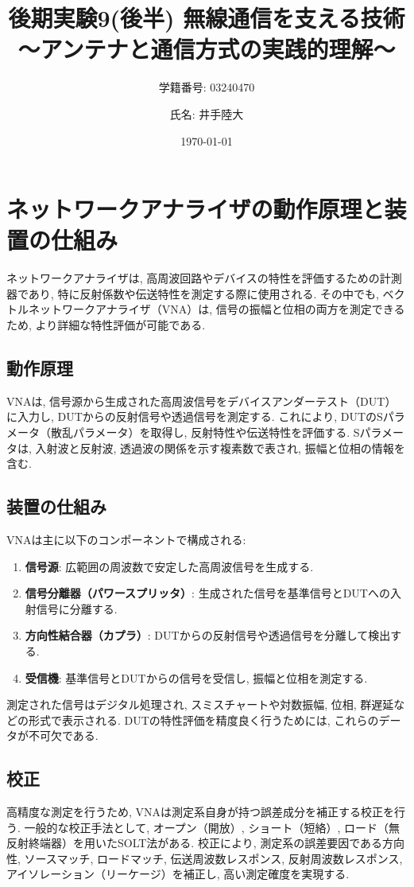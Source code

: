 \documentclass[a4paper, twocolumn]{article} %
\title{後期実験9(後半) 無線通信を支える技術
～アンテナと通信方式の実践的理解～}
\author{学籍番号: 03240470 \and 氏名: 井手陸大}
\date{\today}
\begin{document}
\maketitle

\section{ネットワークアナライザの動作原理と装置の仕組み}
ネットワークアナライザは, 高周波回路やデバイスの特性を評価するための計測器であり, 特に反射係数や伝送特性を測定する際に使用される. その中でも, ベクトルネットワークアナライザ（VNA）は, 信号の振幅と位相の両方を測定できるため, より詳細な特性評価が可能である.

\subsection{動作原理}
VNAは, 信号源から生成された高周波信号をデバイスアンダーテスト（DUT）に入力し, DUTからの反射信号や透過信号を測定する. これにより, DUTのSパラメータ（散乱パラメータ）を取得し, 反射特性や伝送特性を評価する. Sパラメータは, 入射波と反射波, 透過波の関係を示す複素数で表され, 振幅と位相の情報を含む.

\subsection{装置の仕組み}
VNAは主に以下のコンポーネントで構成される:
\begin{enumerate}
    \item \textbf{信号源}: 広範囲の周波数で安定した高周波信号を生成する.
    \item \textbf{信号分離器（パワースプリッタ）}: 生成された信号を基準信号とDUTへの入射信号に分離する.
    \item \textbf{方向性結合器（カプラ）}: DUTからの反射信号や透過信号を分離して検出する.
    \item \textbf{受信機}: 基準信号とDUTからの信号を受信し, 振幅と位相を測定する.
\end{enumerate}

測定された信号はデジタル処理され, スミスチャートや対数振幅, 位相, 群遅延などの形式で表示される. DUTの特性評価を精度良く行うためには, これらのデータが不可欠である.

\subsection{校正}
高精度な測定を行うため, VNAは測定系自身が持つ誤差成分を補正する校正を行う. 一般的な校正手法として, オープン（開放）, ショート（短絡）, ロード（無反射終端器）を用いたSOLT法がある. 校正により, 測定系の誤差要因である方向性, ソースマッチ, ロードマッチ, 伝送周波数レスポンス, 反射周波数レスポンス, アイソレーション（リーケージ）を補正し, 高い測定確度を実現する.
\end{document}
